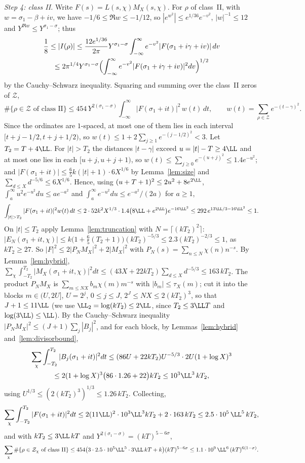 \emph{Step 4: class II.} Write $F(s)=L(s,\chi)M_X(s,\chi)$. For $\rho$ of class~II, with $w=\sigma_1-\beta+iv$, we have $-1/6\le\Re w\le-1/12$, so $|e^{w^2}|\le e^{1/36}e^{-v^2}$, $|w|^{-1}\le12$ and $Y^{\Re w}\le Y^{\sigma_1-\sigma}$; thus
\begin{multline*}
  \frac18\le|I(\rho)|\le\frac{12e^{1/36}}{2\pi}Y^{\sigma_1-\sigma}\int_{-\infty}^\infty e^{-v^2}|F(\sigma_1+i\gamma+iv)|\,dv\\
  \le2\pi^{1/4}Y^{\sigma_1-\sigma}\Bigl(\int_{-\infty}^\infty e^{-v^2}|F(\sigma_1+i\gamma+iv)|^2dv\Bigr)^{1/2}
\end{multline*}
by the Cauchy--Schwarz inequality. Squaring and summing over the class~II zeros of $\mathcal Z$,
\[
  \#\{\rho\in\mathcal Z\text{ of class II}\}\le454\,Y^{2(\sigma_1-\sigma)}\int_{-\infty}^\infty|F(\sigma_1+it)|^2\,w(t)\,dt,\qquad w(t)=\sum_{\rho\in\mathcal Z}e^{-(t-\gamma)^2}.
\]
Since the ordinates are $1$-spaced, at most one of them lies in each interval $[t+j-1/2,t+j+1/2)$, so $w(t)\le1+2\sum_{j\ge1}e^{-(j-1/2)^2}<3$. Let $T_2=T+4\LL$. For $|t|>T_2$ the distances $|t-\gamma|$ exceed $u=|t|-T\ge4\LL$ and at most one lies in each $[u+j,u+j+1)$, so $w(t)\le\sum_{j\ge0}e^{-(u+j)^2}\le1.4e^{-u^2}$; and $|F(\sigma_1+it)|\le\frac65k(|t|+1)\cdot6X^{1/6}$ by Lemma~\ref{lem:size} and $\sum_{d\le X}d^{-5/6}\le6X^{1/6}$. Hence, using $(u+T+1)^2\le2u^2+8e^{2\LL}$, $\int_a^\infty u^2e^{-u^2}du\le ae^{-a^2}$ and $\int_a^\infty e^{-u^2}du\le e^{-a^2}/(2a)$ for $a\ge1$,
\[
  \int_{|t|>T_2}|F(\sigma_1+it)|^2w(t)\,dt\le2\cdot52k^2X^{1/3}\cdot1.4\bigl(8\LL+e^{2\LL}\bigr)e^{-16\LL^2}\le292\,e^{13\LL/3-16\LL^2}\le1 .
\]
On $|t|\le T_2$ apply Lemma~\ref{lem:truncation} with $N=\lceil(kT_2)^2\rceil$: $|E_N(\sigma_1+it,\chi)|\le k\bigl(1+\tfrac65(T_2+1)\bigr)(kT_2)^{-5/3}\le2.3(kT_2)^{-2/3}\le1$, as $kT_2\ge27$. So $|F|^2\le2|P_NM_X|^2+2|M_X|^2$ with $P_N(s)=\sum_{n\le N}\chi(n)n^{-s}$. By Lemma~\ref{lem:hybrid}, $\sum_\chi\int_{-T_2}^{T_2}|M_X(\sigma_1+it,\chi)|^2dt\le(43X+22kT_2)\sum_{d\le X}d^{-5/3}\le163\,kT_2$. The product $P_NM_X$ is $\sum_{m\le NX}b_m\chi(m)m^{-s}$ with $|b_m|\le\tau_X(m)$; cut it into the blocks $m\in(U,2U]$, $U=2^j$, $0\le j\le J$, $2^J\le NX\le2(kT_2)^3$, so that $J+1\le11\LL$ (we use $\LL_2=\log(kT_2)\le2\LL$, since $T_2\le3\LL T$ and $\log(3\LL)\le\LL$). By the Cauchy--Schwarz inequality $|P_NM_X|^2\le(J+1)\sum_j|B_j|^2$, and for each block, by Lemmas~\ref{lem:hybrid} and~\ref{lem:divisorbound},
\begin{multline*}
  \sum_\chi\int_{-T_2}^{T_2}|B_j(\sigma_1+it)|^2dt\le(86U+22kT_2)U^{-5/3}\cdot2U(1+\log X)^3\\
  \le2(1+\log X)^3\bigl(86\cdot1.26+22\bigr)kT_2\le10^3\LL^3\,kT_2 ,
\end{multline*}
using $U^{1/3}\le(2(kT_2)^3)^{1/3}\le1.26\,kT_2$. Collecting,
\[
  \sum_\chi\int_{-T_2}^{T_2}|F(\sigma_1+it)|^2dt\le2(11\LL)^2\cdot10^3\LL^3kT_2+2\cdot163\,kT_2\le2.5\cdot10^5\,\LL^5\,kT_2 ,
\]
and with $kT_2\le3\LL\,kT$ and $Y^{2(\sigma_1-\sigma)}=(kT)^{5-6\sigma}$,
\begin{equation}\label{eq:classII}
  \sum_\chi\#\{\rho\in\mathcal Z_\chi\text{ of class II}\}\le454\bigl(3\cdot2.5\cdot10^5\LL^5\cdot3\LL\,kT+k\bigr)(kT)^{5-6\sigma}\le1.1\cdot10^9\,\LL^6\,(kT)^{6(1-\sigma)} .
\end{equation}

